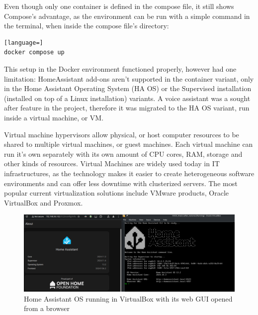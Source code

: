Even though only one container is defined in the compose file, it still shows Compose's advantage, as the environment can be run with a simple command in the terminal, when inside the compose file's directory:

\begin{lstlisting}[language=]
docker compose up
\end{lstlisting}

This setup in the Docker environment functioned properly, however had one limitation: HomeAssistant add-ons aren't supported in the container variant, only in the Home Assistant Operating System (HA OS) or the Supervised installation (installed on top of a Linux installation) variants. \cite{HAaddons} A voice assistant was a sought after feature in the project, therefore it was migrated to the HA OS variant, run inside a virtual machine, or VM.

Virtual machine hypervisors allow physical, or host computer resources to be shared to multiple virtual machines, or guest machines. \cite{VMwareVM} Each virtual machine can run it's own separately with its own amount of CPU cores, RAM, storage and other kinds of resources. Virtual Machines are widely used today in IT infrastructures, as the technology makes it easier to create heterogeneous software environments and can offer less downtime with clusterized servers. The most popular current virtualization solutions include VMware products, Oracle VirtualBox and Proxmox. \cite{G2freeVM}

\begin{figure}[!ht]
  \centering
  \includegraphics[width=150mm, keepaspectratio]{figures/homeassistant_about.png}
  \caption{Home Assistant OS running in VirtualBox with its web GUI opened from a browser}
  \label{fig:HAabout}
\end{figure}

